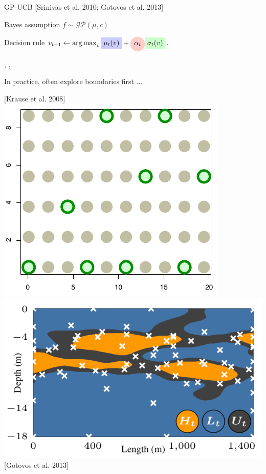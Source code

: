 \documentclass[size36_42,landscape]{a0poster}
\newenvironment{coldinglist}[2]	    {
\begin{list}
  {\textcolor{#2}{\ding{#1}}}{
\setlength{\parskip}{0pt}
\setlength{\itemsep}{0pt}
\setlength{\parsep}{0pt}
}
	}
	{\end{list}}
\DeclareMathOperator*{\argmax}{\arg\max}
\begin{document}
\begin{multicols}{3}
\begin{coldinglist}{112}{blue}
\item GP-UCB [Srinivas et al. 2010; Gotovos et al. 2013] 
\begin{coldinglist}{123}{blue}
\item Bayes assumption $f \sim \mathcal{GP}(\mu, c) $



 \item Decision rule $v_{t+1}\leftarrow \argmax_v
 \tikz[baseline,remember picture]{\node[fill=blue!20,anchor=base] (mut) {$ \mu_t(v)$};}
 +
 \tikz[baseline,remember picture]{\node[fill=red!20, circle, anchor=base] (aat) {$ \alpha_t$};}
 \tikz[baseline,remember picture]{\node[fill=green!20,anchor=base] (sigmat) {$ \sigma_t(v)$};}
 $.

 
\hspace{1.5em}
, , 

\item In practice, often explore boundaries first ...
% 
    \begin{center}
    {\footnotesize [Krause et al. 2008]}\hspace{-1em}
    \includegraphics[width=.27\linewidth]{krause_boundary.pdf}
    \includegraphics[width=.4\linewidth]{pond_boundary.pdf}
    \hspace{-1em}
    {\footnotesize [Gotovos et al. 2013]}
    \end{center}
    

\end{coldinglist}
\end{coldinglist}
\end{multicols}
\end{document}
